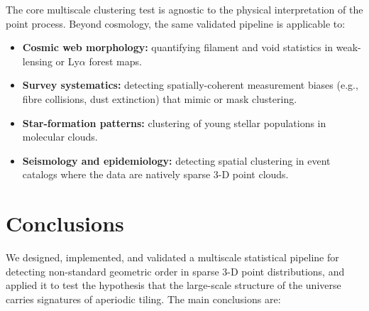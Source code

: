 \documentclass[12pt,a4paper]{article}
\begin{document}
The core multiscale clustering test is agnostic to the physical interpretation
of the point process.  Beyond cosmology, the same validated pipeline is
applicable to:

\begin{itemize}
  \item \textbf{Cosmic web morphology:} quantifying filament and void statistics
        in weak-lensing or Ly$\alpha$ forest maps.
  \item \textbf{Survey systematics:} detecting spatially-coherent measurement
        biases (e.g., fibre collisions, dust extinction) that mimic or mask
        clustering.
  \item \textbf{Star-formation patterns:} clustering of young stellar populations
        in molecular clouds.
  \item \textbf{Seismology and epidemiology:} detecting spatial clustering in
        event catalogs where the data are natively sparse 3-D point clouds.
\end{itemize}

\section{Conclusions}
\label{sec:conclusions}

We designed, implemented, and validated a multiscale statistical pipeline for
detecting non-standard geometric order in sparse 3-D point distributions, and
applied it to test the hypothesis that the large-scale structure of the universe
carries signatures of aperiodic tiling.  The main conclusions are:
\end{document}
